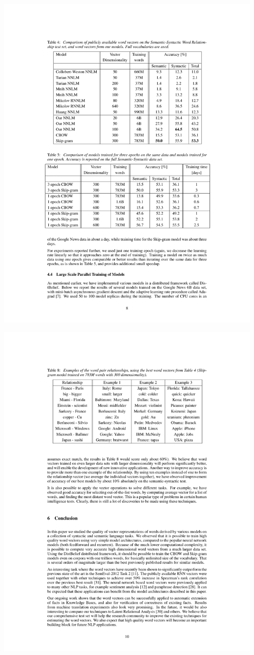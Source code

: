 \documentclass{beamer}
\begin{document}
\begin{frame}
\includegraphics[width=\linewidth]{mikolov-results2}
\end{frame}

\begin{frame}
\includegraphics[width=\linewidth]{mikolov-example-relationships}
\end{frame}
\end{document}
